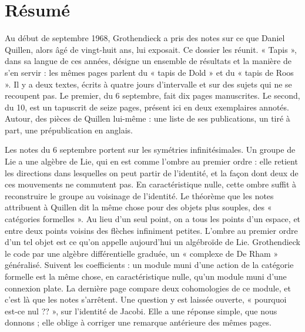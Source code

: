 \documentclass[11pt,a4paper]{article}
\begin{document}
\section*{Résumé}

\begin{resume}
Au début de septembre 1968, Grothendieck a pris des notes sur ce que Daniel
Quillen, alors âgé de vingt-huit ans, lui exposait. Ce dossier les réunit.
« Tapis », dans sa langue de ces années, désigne un ensemble de résultats et la
manière de s'en servir : les mêmes pages parlent du « tapis de Dold » et du
« tapis de Roos ». Il y a deux textes, écrits à quatre jours d'intervalle et sur
des sujets qui ne se recoupent pas. Le premier, du 6 septembre, fait dix pages
manuscrites. Le second, du 10, est un tapuscrit de seize pages, présent ici en
deux exemplaires annotés. Autour, des pièces de Quillen lui-même : une liste de
ses publications, un tiré à part, une prépublication en anglais.

Les notes du 6 septembre portent sur les symétries infinitésimales. Un groupe
de Lie a une algèbre de Lie, qui en est comme l'ombre au premier ordre : elle
retient les directions dans lesquelles on peut partir de l'identité, et la façon
dont deux de ces mouvements ne commutent pas. En caractéristique nulle, cette
ombre suffit à reconstruire le groupe au voisinage de l'identité. Le théorème
que les notes attribuent à Quillen dit la même chose pour des objets plus
souples, des « catégories formelles ». Au lieu d'un seul point, on a tous les
points d'un espace, et entre deux points voisins des flèches infiniment
petites. L'ombre au premier ordre d'un tel objet est ce qu'on appelle
aujourd'hui un algébroïde de Lie. Grothendieck le code par une algèbre
différentielle graduée, un « complexe de De Rham » généralisé. Suivent les
coefficients : un module muni d'une action de la catégorie formelle est la même
chose, en caractéristique nulle, qu'un module muni d'une connexion plate. La dernière page compare deux
cohomologies de ce module, et c'est là que les notes s'arrêtent. Une question
y est laissée ouverte, « pourquoi est-ce nul ?? », sur l'identité de Jacobi.
Elle a une réponse simple, que nous donnons ; elle oblige à corriger une remarque
antérieure des mêmes pages.


\end{resume}
\end{document}
